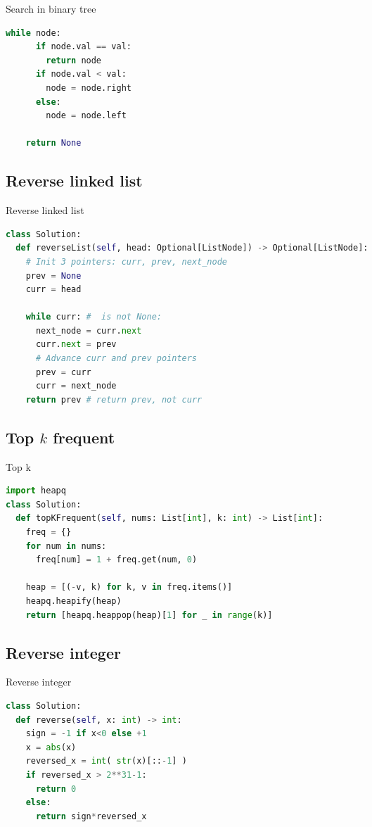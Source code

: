 \documentclass[a4paper,12pt]{article}
\begin{document}
\begin{multicols}{2}
\begin{mycode}[label={lst:search-binary-tree}]{Search in binary tree}
\begin{lstlisting}[language=Python]
    while node:
      if node.val == val:
        return node
      if node.val < val:
        node = node.right
      else:
        node = node.left
    
    return None
\end{lstlisting}
\end{mycode}


\subsection{Reverse linked list}

\begin{mycode}[label={lst:reverse-linked-list}]{Reverse linked list}
\begin{lstlisting}[language=Python]
class Solution:
  def reverseList(self, head: Optional[ListNode]) -> Optional[ListNode]:
    # Init 3 pointers: curr, prev, next_node
    prev = None
    curr = head

    while curr: #  is not None:
      next_node = curr.next
      curr.next = prev
      # Advance curr and prev pointers
      prev = curr
      curr = next_node
    return prev # return prev, not curr
\end{lstlisting}
\end{mycode}

\subsection{Top $k$ frequent}

\begin{mycode}[label={lst:top-k}]{Top k}
\begin{lstlisting}[language=Python]
import heapq
class Solution:
  def topKFrequent(self, nums: List[int], k: int) -> List[int]:
    freq = {}
    for num in nums:
      freq[num] = 1 + freq.get(num, 0)

    heap = [(-v, k) for k, v in freq.items()]
    heapq.heapify(heap)
    return [heapq.heappop(heap)[1] for _ in range(k)]
\end{lstlisting}
\end{mycode}

\subsection{Reverse integer}

\begin{mycode}[label={lst:reverse-integer}]{Reverse integer}
\begin{lstlisting}[language=Python]
class Solution:
  def reverse(self, x: int) -> int:
    sign = -1 if x<0 else +1
    x = abs(x)
    reversed_x = int( str(x)[::-1] )
    if reversed_x > 2**31-1:
      return 0
    else:
      return sign*reversed_x
\end{lstlisting}
\end{mycode}


\end{multicols}
\end{document}
